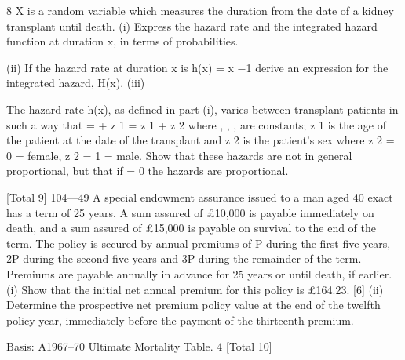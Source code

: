 8
X is a random variable which measures the duration from the date of a kidney
transplant until death.
(i) Express the hazard rate and the integrated hazard function at duration
x, in terms of probabilities.

(ii) If the hazard rate at duration x is
h(x) = \alpha\lambda x \alpha−1
derive an expression for the integrated hazard, H(x).
(iii)

The hazard rate h(x), as defined in part (i), varies between transplant
patients in such a way that
\alpha =  +  z 1
\lambda =  z 1 +  z 2
where  ,  ,  ,  are constants; z 1 is the age of the patient at the date
of the transplant and z 2 is the patient’s sex where z 2 = 0 = female,
z 2 = 1 = male.
Show that these hazards are not in general proportional, but that if
 = 0 the hazards are proportional.

[Total 9]
104—49
A special endowment assurance issued to a man aged 40 exact has a term of 25
years. A sum assured of £10,000 is payable immediately on death, and a sum
assured of £15,000 is payable on survival to the end of the term.
The policy is secured by annual premiums of P during the first five years, 2P
during the second five years and 3P during the remainder of the term.
Premiums are payable annually in advance for 25 years or until death, if
earlier.
(i) Show that the initial net annual premium for this policy is £164.23.
[6]
(ii) Determine the prospective net premium policy value at the end of the
twelfth policy year, immediately before the payment of the thirteenth
premium.

Basis: A1967–70 Ultimate Mortality Table. 4%
[Total 10]



